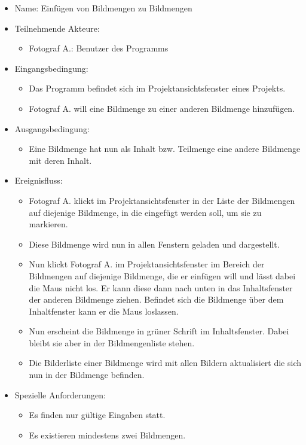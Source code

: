 	\begin{itemize}
		\item Name: Einfügen von Bildmengen zu Bildmengen
		\item Teilnehmende Akteure:
		\begin{itemize}
			\item	Fotograf A.: Benutzer des Programms		
		\end{itemize}
		\item Eingangsbedingung:
		\begin{itemize}
			\item	Das Programm befindet sich im Projektansichtsfenster eines Projekts.
			\item Fotograf A. will eine Bildmenge zu einer anderen Bildmenge hinzufügen.
		\end{itemize}
		\item Ausgangsbedingung:
		\begin{itemize}
			\item	Eine Bildmenge hat nun als Inhalt bzw. Teilmenge eine andere Bildmenge mit deren Inhalt. 	
		\end{itemize}
		\item Ereignisfluss:
		\begin{itemize}
			\item Fotograf A. klickt im Projektansichtsfenster in der Liste der Bildmengen auf diejenige Bildmenge, in die eingefügt werden soll, um sie zu markieren.
			\item Diese Bildmenge wird nun in allen Fenstern geladen und dargestellt.
			\item Nun klickt Fotograf A. im Projektansichtsfenster im Bereich der Bildmengen auf diejenige Bildmenge, die er einfügen will und lässt dabei die Maus nicht los. Er kann diese dann nach unten in das Inhaltsfenster der anderen Bildmenge ziehen. Befindet sich die Bildmenge über dem Inhaltfenster kann er die Maus loslassen.
			\item Nun erscheint die Bildmenge in grüner Schrift im Inhaltsfenster. Dabei bleibt sie aber in der Bildmengenliste stehen.
			\item Die Bilderliste einer Bildmenge wird mit allen Bildern aktualisiert die sich nun in der Bildmenge befinden.
		\end{itemize}
		\item Spezielle Anforderungen:
		\begin{itemize}
			\item	Es finden nur gültige Eingaben statt.
			\item Es existieren mindestens zwei Bildmengen.
		\end{itemize}			
	\end{itemize}
	
